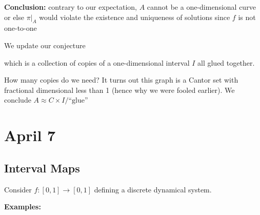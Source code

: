 \documentclass[12pt]{report}
\newcommand*{\tbf}[1]{\ifmmode\mathbf{#1}\else\textbf{#1}\fi}
\begin{document}
\tbf{Conclusion:} contrary to our expectation, $A$ cannot be a one-dimensional curve or else $\pi \big\vert_A$ would violate the existence and uniqueness of solutions since $f$ is not one-to-one

We update our conjecture

\begin{center}
\end{center}

which is a collection of copies of a one-dimensional interval $I$ all glued together.

How many copies do we need? It turns out this graph is a Cantor set with fractional dimensional less than 1 (hence why we were fooled earlier). We conclude $A \approx C \times I/\text{``glue''}$

\section{April 7}
\subsection{Interval Maps}
Consider $f: [0, 1] \to [0, 1]$ defining a discrete dynamical system.

\tbf{Examples:}
\end{document}
